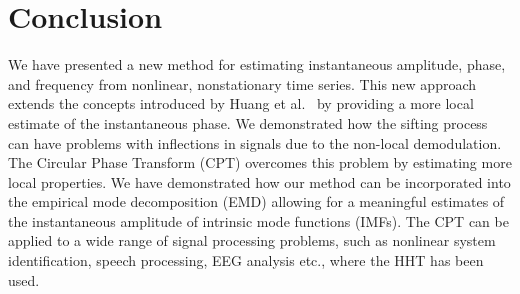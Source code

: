 \documentclass[journal,11pt,a4paper,onecolumn,draftcls]{IEEEtran}
\begin{document}


\section{Conclusion}\label{sect:ConclusionSection}
We have presented a new method for estimating instantaneous amplitude, phase, and frequency from nonlinear, nonstationary time series. This new approach extends the concepts introduced by Huang et al.~\cite{Huang1998} by providing a more local estimate of the instantaneous phase. We demonstrated how the sifting process can have problems with inflections in signals due to the non-local demodulation. The Circular Phase Transform (CPT) overcomes this problem by estimating more local properties. We have demonstrated how our method can be incorporated into the empirical mode decomposition (EMD) allowing for a meaningful estimates of the instantaneous amplitude of intrinsic mode functions (IMFs). The CPT can be applied to a wide range of signal processing problems, such as nonlinear system identification, speech processing, EEG analysis etc., where the HHT has been used. 
\end{document}
